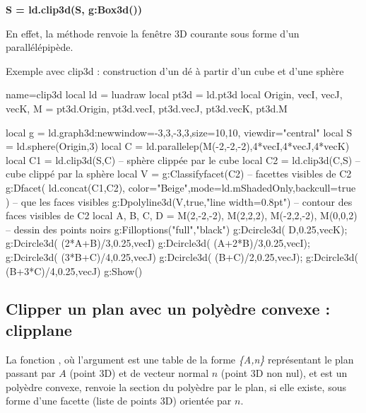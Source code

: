 \begin{center}
\textbf{S = ld.clip3d(S, g:Box3d())}
\end{center}

En effet, la méthode  renvoie la fenêtre 3D courante sous forme d'un parallélépipède.

\begin{demo}[clip3d]{Exemple avec clip3d : construction d'un dé à partir d'un cube et d'une sphère}
\begin{luadraw}{name=clip3d}
local ld = luadraw
local pt3d = ld.pt3d
local Origin, vecI, vecJ, vecK, M = pt3d.Origin, pt3d.vecI, pt3d.vecJ, pt3d.vecK, pt3d.M

local g = ld.graph3d:new{window={-3,3,-3,3},size={10,10}, viewdir="central"}
local S = ld.sphere(Origin,3)
local C = ld.parallelep(M(-2,-2,-2),4*vecI,4*vecJ,4*vecK)
local C1 = ld.clip3d(S,C) -- sphère clippée par le cube
local C2 = ld.clip3d(C,S) -- cube clippé par la sphère
local V = g:Classifyfacet(C2) -- facettes visibles de C2
g:Dfacet( ld.concat(C1,C2), {color="Beige",mode=ld.mShadedOnly,backcull=true} ) -- que les faces visibles
g:Dpolyline3d(V,true,"line width=0.8pt") -- contour des faces visibles de C2
local A, B, C, D = M(2,-2,-2), M(2,2,2), M(-2,2,-2), M(0,0,2) -- dessin des points noirs
g:Filloptions("full","black")
g:Dcircle3d( D,0.25,vecK); g:Dcircle3d( (2*A+B)/3,0.25,vecI)
g:Dcircle3d( (A+2*B)/3,0.25,vecI); g:Dcircle3d( (3*B+C)/4,0.25,vecJ)
g:Dcircle3d( (B+C)/2,0.25,vecJ); g:Dcircle3d( (B+3*C)/4,0.25,vecJ)
g:Show()
\end{luadraw}
\end{demo}

\subsection{Clipper un plan avec un polyèdre convexe : clipplane}

La fonction , où l'argument  est une table de la forme \emph{\{A,n\}} représentant le plan passant par $A$ (point 3D) et de vecteur normal $n$ (point 3D non nul), et  est un polyèdre convexe, renvoie la section du polyèdre par le plan, si elle existe, sous forme d'une facette (liste de points 3D) orientée par $n$.
